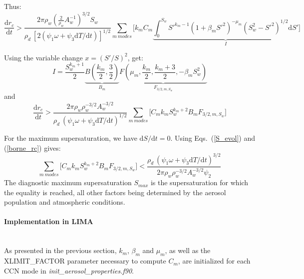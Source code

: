Thus:
\begin{equation}
 \frac{\mathrm{d}r_c}{\mathrm{d}t} > \frac{2 \pi \rho_w \left(\frac{2}{\rho_w} A_w^{-1}\right)^{3/2} S_w}{\rho_d ~ [2(\psi_1 \omega + \psi_3 \mathrm{d}T/\mathrm{d}t)]^{1/2}} \sum_{m~modes} \bigg[ k_m C_m \underbrace{\int_0^{S_w}  S'^{k_m-1} (1+\beta_m S'^2)^{-\mu_m} (S_w^2-S'^2)^{1/2} \mathrm{d}S'}_{I} \bigg]
\end{equation}

Using the variable change $x=(S'/S)^2$, \citet{Cohard1998} get:
\begin{equation}
 I = \frac{S_w^{k_m+1}}{2} \underbrace{B\left(\frac{k_m}{2},\frac{3}{2}\right)}_{B_m} \underbrace{F\left(\mu_m,\frac{k_m}{2},\frac{k_m+3}{2},-\beta_mS_w^2\right)}_{F_{3/2,m,S_w}}
\end{equation}
and
\begin{equation}
  \label{borne_rc}
 \frac{\mathrm{d}r_c}{\mathrm{d}t} > \frac{2 \pi \rho_w \rho_w^{-3/2} A_w^{-3/2} }{\rho_d ~ (\psi_1 \omega + \psi_3 \mathrm{d}T/\mathrm{d}t)^{1/2}} \sum_{m~modes} \bigg[ C_m k_m S_w^{k_m+2} B_m F_{3/2,m,S_w} \bigg]
\end{equation}

For the maximum supersaturation, we have $\mathrm{d}S/\mathrm{d}t=0$. Using Eqs.\ (\ref{S_evol}) and (\ref{borne_rc}) gives:
\begin{equation}
 \label{eq-smax}
 \sum_{m~modes} \bigg[ C_m k_m S_w^{k_m+2} B_m F_{3/2,m,S_w} \bigg] < \frac{\rho_d ~ (\psi_1 \omega + \psi_3 \mathrm{d}T/\mathrm{d}t)^{3/2}}{2 \pi \rho_w \rho_w^{-3/2} A_w^{-3/2} \psi_2}
\end{equation}
The diagnostic maximum supersaturation $S_{max}$ is the supersaturation for which the equality is reached, all other factors being determined by the aerosol population and atmospheric conditions.


\paragraph{Implementation in LIMA}
~\\
As presented in the previous section, $k_m$, $\beta_m$ and $\mu_m$, as well as the XLIMIT\_FACTOR parameter necessary to compute $C_m$, are initialized for each CCN mode in \emph{init\_aerosol\_properties.f90}. 

~\newline

